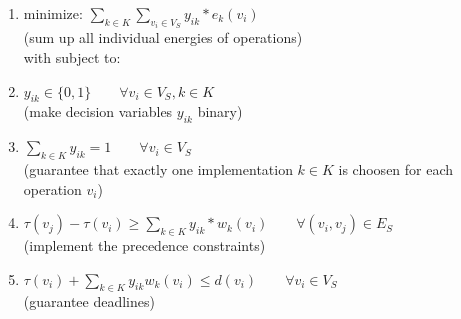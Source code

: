 \begin{enumerate}

\item minimize: $ \sum_{k \in K} \sum_{v_i \in V_S} y_{ik} * e_k(v_i)$ \\
	(sum up all individual energies of operations) \\
with subject to:
\item $y_{ik} \in \{ 0, 1\} \qquad \forall v_i \in V_S, k \in K$ \\
	(make decision variables $y_{ik}$ binary)
\item $\sum_{k \in K} y_{ik} = 1 \qquad \forall v_i \in V_S $ \\
	(guarantee that exactly one implementation $k \in K$ is choosen for each operation $v_i$)
\item $\tau(v_j) - \tau(v_i) \geq \sum_{k \in K} y_{ik} * w_k(v_i) \qquad \forall (v_i, v_j) \in E_S$ \\
	(implement the precedence constraints)
\item $\tau(v_i) + \sum_{k \in K} y_{ik} w_k(v_i) \leq d(v_i) \qquad \forall v_i \in V_S$ \\
	(guarantee deadlines)

\end{enumerate}



\cleardoublepage